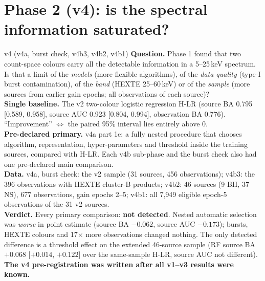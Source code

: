 \chapter{Phase 2 (v4): is the spectral information saturated?}\label{ch:phase2}

\begin{glance}{v4 (v4a, burst check, v4b3, v4b2, v4b1)}
\textbf{Question.} Phase 1 found that two count-space colours carry all the detectable information in a 5--25\,keV
spectrum. Is that a limit of the \emph{models} (more flexible algorithms), of the \emph{data quality} (type-I burst
contamination), of the \emph{band} (HEXTE 25--60\,keV) or of the \emph{sample} (more sources from earlier gain epochs;
all observations of each source)? \\
\textbf{Single baseline.} The v2 two-colour logistic regression H-LR (source BA 0.795 [0.589, 0.958], source AUC 0.923
[0.804, 0.994], observation BA 0.776). ``Improvement'' $\Leftrightarrow$ the paired 95\% interval lies entirely above 0. \\
\textbf{Pre-declared primary.} v4a part 1e: a fully nested procedure that chooses algorithm, representation,
hyper-parameters and threshold inside the training sources, compared with H-LR. Each v4b sub-phase and the burst check
also had one pre-declared main comparison. \\
\textbf{Data.} v4a, burst check: the v2 sample (31 sources, 456 observations); v4b3: the 396 observations with HEXTE
cluster-B products; v4b2: 46 sources (9 BH, 37 NS), 677 observations, gain epochs 2--5; v4b1: all 7,949 eligible epoch-5
observations of the 31 v2 sources. \\
\textbf{Verdict.} Every primary comparison: \textbf{not detected}. Nested automatic selection was \emph{worse} in point
estimate (source BA $-0.062$, source AUC $-0.173$); bursts, HEXTE colours and 17$\times$ more observations changed
nothing. The only detected difference is a threshold effect on the extended 46-source sample (RF source BA
$+0.068$ [$+0.014$, $+0.122$] over the same-sample H-LR, source AUC not different). \textbf{The v4 pre-registration
was written after all v1--v3 results were known.}
\end{glance}

